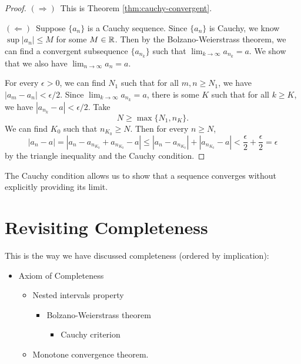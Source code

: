 \begin{proof}
  $(\Rightarrow)$\, This is Theorem \ref{thm:cauchy-convergent}.

  $(\Leftarrow)$\, Suppose $\{a_n\}$ is a Cauchy sequence.
  Since $\{a_n\}$ is Cauchy, we know $\sup |a_n| \le M$
  for some $M \in \mathbb{R}$. Then by the Bolzano-Weierstrass
  theorem, we can find a convergent subsequence
  $\{a_{n_k}\}$ such that
  $\lim_{k \to \infty} a_{n_k} = a$. We show that
  we also have $\lim_{n \to \infty} a_n = a$.

  For every $\epsilon > 0$, we can find $N_1$ such that
  for all $m, n \ge N_1$, we have
  $|a_m - a_n| < \epsilon/2$. Since
  $\lim_{k \to \infty} a_{n_k} = a$, there is some
  $K$ such that for all $k \ge K$, we have
  $|a_{n_k} - a| < \epsilon/2$. Take
  \[N \ge \max\{N_1, n_K\}.\]
  We can find $K_0$ such that $n_{K_0} \ge N$.
  Then for every $n \ge N$,
  \[
    |a_n - a| = |a_n - a_{n_{K_0}} + a_{n_{K_0}} - a|
    \le |a_n - a_{n_{K_0}}| + |a_{n_{K_0}} - a|
    < \frac{\epsilon}{2} + \frac{\epsilon}{2} = \epsilon
  \]
  by the triangle inequality and the Cauchy condition.
\end{proof}

\begin{remark}
  The Cauchy condition allows us to show that a sequence
  converges without explicitly providing its limit.
\end{remark}

\section{Revisiting Completeness}
This is the way we have discussed completeness
(ordered by implication):
\begin{itemize}
  \item Axiom of Completeness
    \begin{itemize}
      \item Nested intervals property
        \begin{itemize}
          \item Bolzano-Weierstrass theorem
            \begin{itemize}
              \item Cauchy criterion
            \end{itemize}
        \end{itemize}
      \item Monotone convergence theorem.
    \end{itemize}
\end{itemize}

